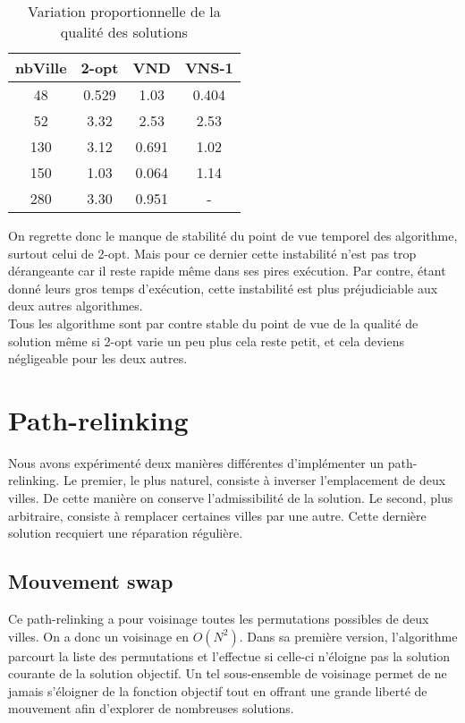 \documentclass[12pt,a4paper]{article}
\begin{document}
\begin{table}[!h]
\centering
\begin{tabular}{|*{4}{c|}}
  \hline
  nbVille & 2-opt & VND & VNS-1 \\
  \hline
  48 & 0.529 & 1.03 & 0.404 \\
  52 & 3.32 & 2.53 & 2.53 \\
  130 & 3.12 & 0.691 & 1.02 \\
  150 & 1.03 & 0.064 & 1.14 \\
  280 & 3.30 & 0.951 & - \\
  \hline
\end{tabular}
\caption{Variation proportionnelle de la qualité des solutions}
\label{vartempsGRASP}
\end{table}

On regrette donc le manque de stabilité du point de vue temporel des algorithme, surtout celui de 2-opt. Mais pour ce dernier cette instabilité n'est pas trop dérangeante car il reste rapide même dans ses pires exécution. Par contre, étant donné leurs gros temps d’exécution, cette instabilité est plus préjudiciable aux deux autres algorithmes.\\

Tous les algorithme sont par contre stable du point de vue de la qualité de solution même si 2-opt varie un peu plus cela reste petit, et cela deviens négligeable pour les deux autres.

\section{Path-relinking}

Nous avons expérimenté deux manières différentes d'implémenter un path-relinking. Le premier, le plus naturel, consiste à inverser l'emplacement de deux villes. De cette manière on conserve l'admissibilité de la solution. Le second, plus arbitraire, consiste à remplacer certaines villes par une autre. Cette dernière solution recquiert une réparation régulière.

\subsection{Mouvement swap}

Ce path-relinking a pour voisinage toutes les permutations possibles de deux villes. On a donc un voisinage en $O(N^2)$. Dans sa première version, l'algorithme parcourt la liste des permutations et l'effectue si celle-ci n'éloigne pas la solution courante de la solution objectif. Un tel sous-ensemble de voisinage permet de ne jamais s'éloigner de la fonction objectif tout en offrant une grande liberté de mouvement afin d'explorer de nombreuses solutions.\\
\end{document}

